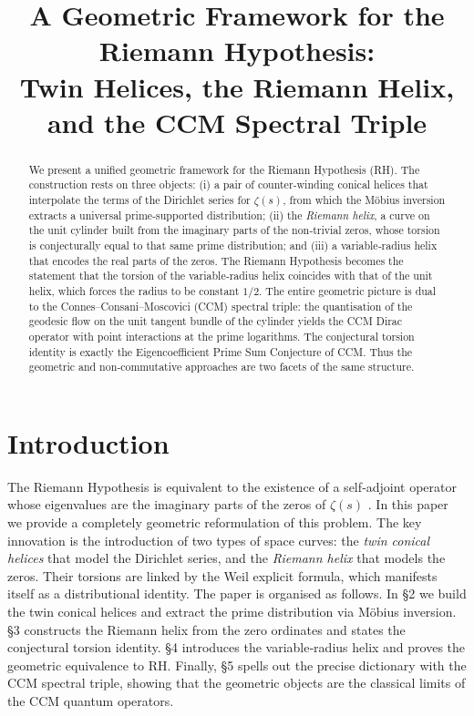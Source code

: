 \documentclass[12pt,a4paper]{article}
\title{\bf A Geometric Framework for the Riemann Hypothesis:\\ Twin Helices, the Riemann Helix, and the CCM Spectral Triple}
\author{}
\date{}
\begin{document}
\maketitle

\begin{abstract}
We present a unified geometric framework for the Riemann Hypothesis (RH).  The construction rests on three objects: (i) a pair of counter‑winding conical helices that interpolate the terms of the Dirichlet series for $\zeta(s)$, from which the M\"obius inversion extracts a universal prime‑supported distribution; (ii) the \emph{Riemann helix}, a curve on the unit cylinder built from the imaginary parts of the non‑trivial zeros, whose torsion is conjecturally equal to that same prime distribution; and (iii) a variable‑radius helix that encodes the real parts of the zeros.  The Riemann Hypothesis becomes the statement that the torsion of the variable‑radius helix coincides with that of the unit helix, which forces the radius to be constant $1/2$.  The entire geometric picture is dual to the Connes–Consani–Moscovici (CCM) spectral triple: the quantisation of the geodesic flow on the unit tangent bundle of the cylinder yields the CCM Dirac operator with point interactions at the prime logarithms.  The conjectural torsion identity is exactly the Eigencoefficient Prime Sum Conjecture of CCM.  Thus the geometric and non‑commutative approaches are two facets of the same structure.
\end{abstract}

\section{Introduction}
The Riemann Hypothesis is equivalent to the existence of a self‑adjoint operator whose eigenvalues are the imaginary parts of the zeros of $\zeta(s)$ \cite{CCM}.  In this paper we provide a completely geometric reformulation of this problem.  The key innovation is the introduction of two types of space curves: the \emph{twin conical helices} that model the Dirichlet series, and the \emph{Riemann helix} that models the zeros.  Their torsions are linked by the Weil explicit formula, which manifests itself as a distributional identity.  The paper is organised as follows.  In §2 we build the twin conical helices and extract the prime distribution via M\"obius inversion.  §3 constructs the Riemann helix from the zero ordinates and states the conjectural torsion identity.  §4 introduces the variable‑radius helix and proves the geometric equivalence to RH.  Finally, §5 spells out the precise dictionary with the CCM spectral triple, showing that the geometric objects are the classical limits of the CCM quantum operators.
\end{document}
